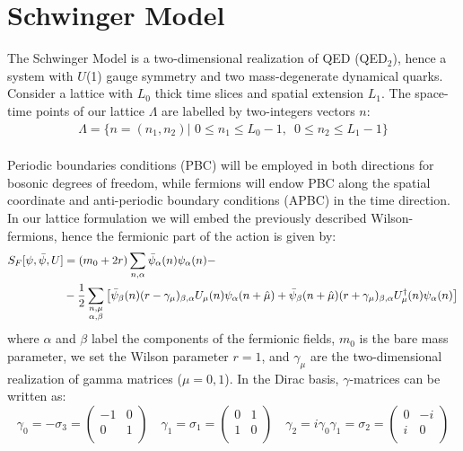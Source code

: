 \section{Schwinger Model}
The Schwinger Model is a two-dimensional realization of QED (QED$_2$), hence a system with $U$(1) gauge symmetry and two mass-degenerate dynamical quarks.
\\ Consider a lattice with $L_0$ thick time slices and spatial extension $L_1$. The space-time points of our lattice $\Lambda$ are labelled by two-integers vectors $n$:
\begin{equation}\label{lattice 2d}
\begin{split}
        \Lambda = \{ n = (n_1, n_2)  | 
        \,\, 0 \leq n_1 \leq L_0 - 1, \,\,\,
        0 \leq n_2 \leq L_1 - 1 \}
\end{split}
\end{equation}
\\ Periodic boundaries conditions (PBC) will be employed in both directions for bosonic degrees of freedom, while fermions will endow PBC along the spatial coordinate and anti-periodic boundary conditions (APBC) in the time direction.
\\ In our lattice formulation we will embed the previously described Wilson-fermions, hence the fermionic part of the action is given by:
\begin{equation}
\begin{split}
    S_F [\psi, \Bar{\psi}, U] &= (m_0 + 2r) \sum_{n, \alpha} \Bar{\psi}_\alpha(n)\psi_\alpha(n) -  \\  
        & - \frac{1}{2}\sum_{\substack{n, \mu \\ \alpha, \beta}}\left[ \Bar{\psi}_\beta(n)(r - \gamma_\mu)_{\beta, \alpha} U_\mu(n) \psi_\alpha(n + \hat{\mu}) + \Bar{\psi}_\beta (n+\hat{\mu}) (r + \gamma_\mu)_{\beta, \alpha} U^\dagger_\mu(n) \psi_\alpha(n) \right] \\
\end{split}
\end{equation}
where $\alpha$ and $\beta$ label the components of the fermionic fields, $m_0$ is the bare mass parameter, we set the Wilson parameter $r = 1$, and $\gamma_\mu$ are the two-dimensional realization of gamma matrices ($\mu = 0, 1$).
In the Dirac basis, $\gamma$-matrices can be written as:
\begin{equation}\label{gammas}
    \gamma_0 = - \sigma_3 = \begin{pmatrix}
 -1 & 0  \\
   0 & 1 \\
\end{pmatrix}
   \,\,\,\,\,\, \gamma_1 = \sigma_1 = \begin{pmatrix}
 0 & 1  \\
   1 & 0 \\
\end{pmatrix}
   \,\,\,\,\,\, \gamma_2 = i\gamma_0 \gamma_1 = \sigma_2 = \begin{pmatrix}
 0 & -i  \\
   i & 0 \\
\end{pmatrix}
\end{equation}
